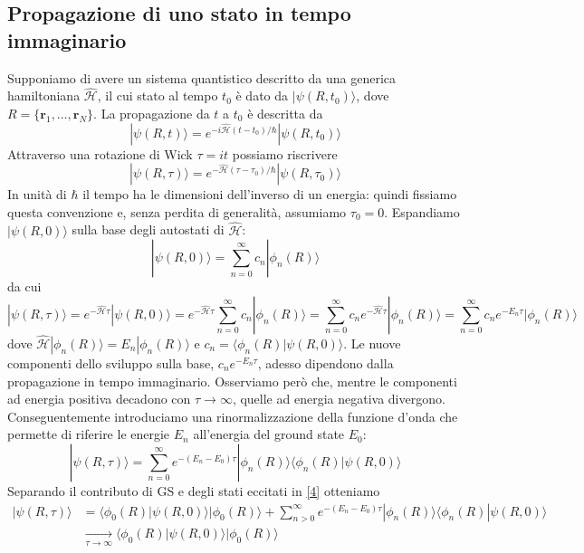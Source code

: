 \documentclass[11pt,a4paper]{article}
\begin{document}
\subsection{Propagazione di uno stato in tempo immaginario}
Supponiamo di avere un sistema quantistico descritto da una generica hamiltoniana $\mathcal{\hat{H}}$, il cui stato al tempo $t_0$ è dato da $|\psi(R,t_0)\rangle$, dove $R = \{\textbf{r}_1,\ldots,\textbf{r}_N\}$. La propagazione da $t$ a $t_0$ è descritta da
\begin{equation}\label{1}
|\psi(R,t)\rangle = e^{-i\mathcal{\hat{H}}(t-t_0)/\hbar}|\psi(R,t_0)\rangle
\end{equation}
Attraverso una rotazione di Wick $\tau = it$ possiamo riscrivere 
\begin{equation}\label{2}
|\psi(R,\tau)\rangle = e^{-\mathcal{\hat{H}}(\tau-\tau_0)/\hbar}|\psi(R,\tau_0)\rangle
\end{equation}
In unità di $\hbar$ il tempo ha le dimensioni dell'inverso di un energia: quindi fissiamo questa convenzione e, senza perdita di generalità, assumiamo $\tau_0 = 0$. Espandiamo $|\psi(R,0)\rangle$ sulla base degli autostati di $\mathcal{\hat{H}}$:
\begin{equation}
|\psi(R,0)\rangle = \sum_{n=0}^{\infty} c_n |\phi_n(R)\rangle
\end{equation}
da cui
\[
|\psi(R,\tau)\rangle = e^{-\mathcal{\hat{H}}\tau}|\psi(R,0)\rangle = e^{-\mathcal{\hat{H}}\tau}\sum_{n=0}^{\infty} c_n |\phi_n(R)\rangle = \sum_{n=0}^{\infty} c_n e^{-\mathcal{\hat{H}}\tau}|\phi_n(R)\rangle = \sum_{n=0}^{\infty} c_n e^{-E_n\tau}|\phi_n(R)\rangle
\]
dove $\mathcal{\hat{H}}|\phi_n(R)\rangle = E_n|\phi_n(R)\rangle$ e $c_n = \langle \phi_n(R)|\psi(R,0)\rangle$. Le nuove componenti dello sviluppo sulla base, $c_n e^{-E_n\tau}$, adesso dipendono dalla propagazione in tempo immaginario. Osserviamo però che, mentre le componenti ad energia positiva decadono con $\tau\to \infty$, quelle ad energia negativa divergono. Conseguentemente introduciamo una rinormalizzazione della funzione d'onda che permette di riferire le energie $E_n$ all'energia del ground state $E_0$:
\begin{equation}\label{4}
|\psi(R,\tau)\rangle = \sum_{n=0}^{\infty} e^{-(E_n-E_0)\tau}|\phi_n(R)\rangle \langle \phi_n(R)|\psi(R,0)\rangle
\end{equation}
Separando il contributo di GS e degli stati eccitati in \eqref{4} otteniamo
\[
\begin{split}
|\psi(R,\tau)\rangle &= \langle \phi_0(R)|\psi(R,0)\rangle|\phi_0(R)\rangle+\sum_{n>0}^{\infty} e^{-(E_n-E_0)\tau}|\phi_n(R)\rangle \langle \phi_n(R)|\psi(R,0)\rangle \\
&\xrightarrow[\tau\to\infty]{} \langle \phi_0(R)|\psi(R,0)\rangle|\phi_0(R)\rangle
\end{split}
\]
\end{document}
